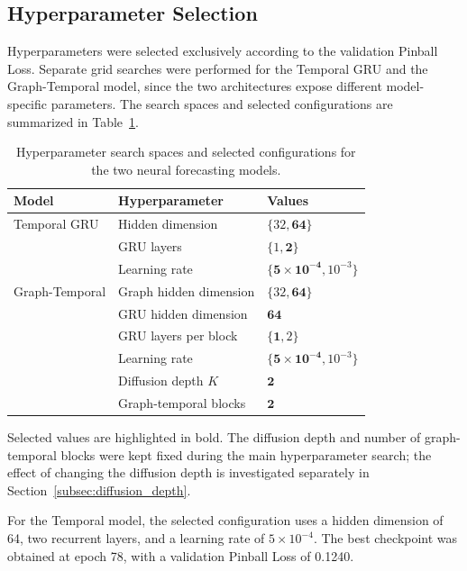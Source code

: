 \subsection{Hyperparameter Selection}
\label{subsec:hyperparameters}

Hyperparameters were selected exclusively according to the validation
Pinball Loss. Separate grid searches were performed for the Temporal GRU and
the Graph-Temporal model, since the two architectures expose different
model-specific parameters. The search spaces and selected configurations are
summarized in Table~\ref{tab:hyperparameters}.

\begin{table}[t]
    \centering
    \caption{Hyperparameter search spaces and selected configurations for the
    two neural forecasting models.}
    \label{tab:hyperparameters}
    \begin{tabular}{lll}
        \toprule
        Model & Hyperparameter & Values \\
        \midrule

        Temporal GRU
        & Hidden dimension & $\{32,\mathbf{64}\}$ \\
        & GRU layers & $\{1,\mathbf{2}\}$ \\
        & Learning rate & $\{\mathbf{5\times10^{-4}},10^{-3}\}$ \\
        \midrule

        Graph-Temporal
        & Graph hidden dimension & $\{32,\mathbf{64}\}$ \\
        & GRU hidden dimension & $\mathbf{64}$ \\
        & GRU layers per block & $\{\mathbf{1},2\}$ \\
        & Learning rate & $\{\mathbf{5\times10^{-4}},10^{-3}\}$ \\
        & Diffusion depth $K$ & $\mathbf{2}$ \\
        & Graph-temporal blocks & $\mathbf{2}$ \\
        \bottomrule
    \end{tabular}
\end{table}

Selected values are highlighted in bold. The diffusion depth and number of
graph-temporal blocks were kept fixed during the main hyperparameter search;
the effect of changing the diffusion depth is investigated separately in
Section~\ref{subsec:diffusion_depth}.

For the Temporal model, the selected configuration uses a hidden dimension of
64, two recurrent layers, and a learning rate of $5\times10^{-4}$. The best
checkpoint was obtained at epoch 78, with a validation Pinball Loss of
0.1240.


